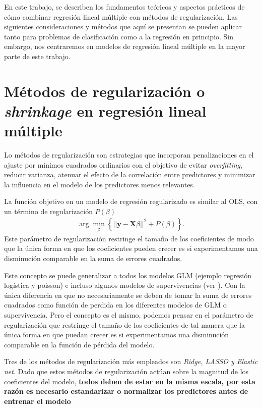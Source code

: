 \documentclass{article}
\newcommand{\X}{\mathbf{X}}
\newcommand{\y}{\mathbf{y}}
\begin{document}
En este trabajo, se describen los fundamentos teóricos y aspectos prácticos de cómo combinar regresión lineal múltiple con métodos de regularización. Las siguientes consideraciones y métodos que aquí se presentan se pueden aplicar tanto para problemas de clasificación como a la regresión en principio. Sin embargo, nos centraremos en modelos de regresión lineal múltiple en la mayor parte de este trabajo.

\section{Métodos de regularización o \textit{shrinkage} en regresión lineal múltiple}

Lo métodos de regularización son estrategias que incorporan penalizaciones en el ajuste por mínimos cuadrados ordinarios con el objetivo de evitar \textit{overfitting}, reducir varianza, atenuar el efecto de la correlación entre predictores y minimizar la influencia en el modelo de los predictores menos relevantes. 

La función objetivo  en un modelo de regresión regularizado es similar al OLS, con un término de regularización $P(\beta)$
\begin{align}
    \arg \min_{\beta} \left\{||\y- \X \beta||^2+P(\beta)\right\}.
\end{align}
Este parámetro de regularización restringe el tamaño de los coeficientes de modo que la única forma en que los coeficientes pueden crecer es si experimentamos una disminución comparable en la suma de errores cuadrados. 

Este concepto se puede generalizar a todos los modelos GLM (ejemplo regresión logística y poisson) e incluso algunos modelos de supervivencias (ver \citep{cox_lasso}). Con la única diferencia en que no necesariamente se deben de tomar la suma de errores cuadrados como función de perdida en los diferentes modelos de GLM o supervivencia. Pero el concepto es el mismo, podemos pensar en el parámetro de regularización que restringe el tamaño de los coeficientes de tal manera que la única forma en que puedan crecer es si experimentamos una disminución comparable en la función de pérdida del modelo.

Tres de los métodos de regularización más empleados son \textit{Ridge, LASSO y Elastic net}. Dado que estos métodos de regularización actúan sobre la magnitud de los coeficientes del modelo, \textbf{todos deben de estar en la misma escala, por esta razón es necesario estandarizar o normalizar los predictores antes de entrenar el modelo} 
\end{document}
